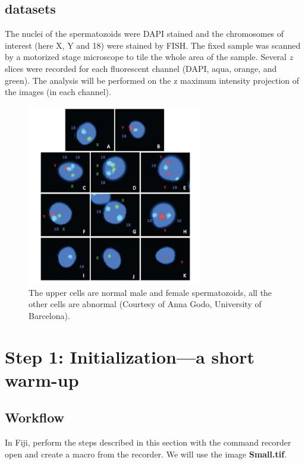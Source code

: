 \documentclass[11pt,a4paper,oneside]{report}
\begin{document}
\subsection{datasets}
The nuclei of the spermatozoids were DAPI stained and the chromosomes of interest (here X, Y and 18) were  stained by FISH. The fixed sample was scanned by a motorized stage microscope to tile the whole area of the sample. Several $z$ slices were recorded for each fluorescent channel (DAPI, aqua, orange, and green). The analysis will be performed on the z maximum intensity projection of the images (in each channel).

\begin{figure}[htbp]
\begin{center}
\includegraphics[width=3in]{fig/intro-eps-converted-to.pdf}
\caption{The upper cells are normal male and female spermatozoids, all the other cells are abnormal (Courtesy of Anna Godo, University of Barcelona).}
\label{fig:intro}
\end{center}
\end{figure}


\newpage
\section{Step 1: Initialization---a short warm-up}

\subsection{Workflow}

In Fiji, perform the steps described in this section with the command recorder open and create a macro from the recorder.
We will use the image \textbf{Small.tif}.\\
\end{document}
